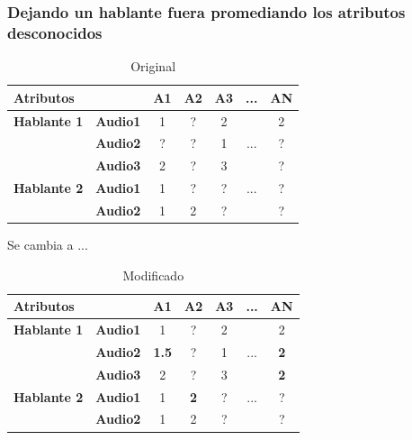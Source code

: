 \documentclass[mathserif]{beamer}%
\begin{document}
\begin{frame}
	\frametitle{Dejando un hablante fuera promediando los atributos desconocidos}
	
	\begin{table}[H]
		\centering
		\resizebox{7cm}{!} {
		\begin{tabular}{|l|l|ccccc|}
			\hline
			\multicolumn{2}{|l|}{Atributos} & A1 & A2 & A3 & ... & AN \\
			\hline 
			\textbf{Hablante 1} & \textbf{Audio1} & 1 & ? & 2 & & 2\\
			& \textbf{Audio2} & ? & ? & 1 & ... & ? \\
			& \textbf{Audio3} & 2 & ? & 3 & & ? \\
			\hline
			\textbf{Hablante 2} & \textbf{Audio1} & 1 & ? & ? & ... & ? \\
			& \textbf{Audio2} & 1 & 2 & ? & & ? \\
			\hline
			\end{tabular}
		}
		\caption{Original}
		\label{}
		\end{table}
		
			
		Se cambia a ...
		
		\begin{table}[H]
			\centering
			\resizebox{7cm}{!} {
			\begin{tabular}{|l|l|ccccc|}
				\hline
				\multicolumn{2}{|l|}{Atributos} & A1 & A2 & A3 & ... & AN \\
				\hline 
				\textbf{Hablante 1} & \textbf{Audio1} & 1 & ? & 2 & & 2\\
				& \textbf{Audio2} & \textbf{1.5} & ? & 1 & ... & \textbf{2} \\
				& \textbf{Audio3} & 2 & ? & 3 & & \textbf{2} \\
				\hline
				\textbf{Hablante 2} & \textbf{Audio1} & 1 & \textbf{2} & ? & ... & ? \\
				& \textbf{Audio2} & 1 & 2 & ? & & ? \\
				\hline
			\end{tabular}
			}
			\caption{Modificado}
			\label{}
		\end{table}
\end{frame}
	
\end{document}
